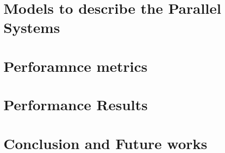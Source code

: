 \documentclass[sigconf,authordraft]{acmart}
\begin{document}
\section{Models to describe the Parallel Systems} \label{models}



\section{Perforamnce metrics} \label{metrics}




\section{Performance Results} \label{results}





\section{Conclusion and Future works} \label{conclusion}






\end{document}
